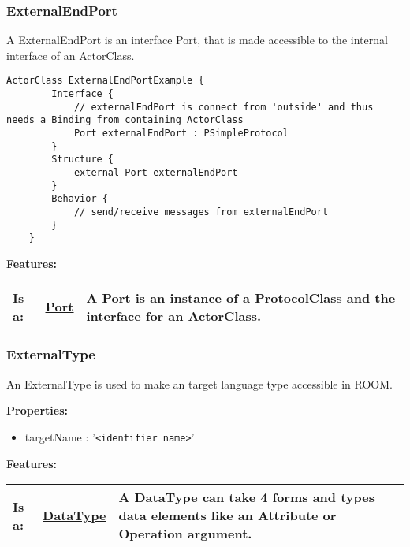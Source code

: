 \subsubsection{ExternalEndPort}
	\hypertarget{ref:ExternalEndPort}{}
	A ExternalEndPort is an interface Port, that is made accessible to the internal interface of an ActorClass.
		
	\begin{lstlisting}[language=ROOM]
	ActorClass ExternalEndPortExample {
		Interface {
			// externalEndPort is connect from 'outside' and thus needs a Binding from containing ActorClass
			Port externalEndPort : PSimpleProtocol
		}
		Structure {
			external Port externalEndPort
		}
		Behavior {
			// send/receive messages from externalEndPort
		}
	}
	\end{lstlisting}
		
		
	\begingroup
	\textbf{Features:}
	\renewcommand{\arraystretch}{1.8} %
	\begin{longtable}{l|l p{}}
		\hline
	Is a: & \tabitem \hyperlink{ref:Port}{Port}  & A Port is an instance of a ProtocolClass and the interface for an ActorClass.\\
	\hline
	\end{longtable}
	\endgroup
		
		
	
	\vspace{\baselineskip}
	\vspace{\baselineskip}
	\vspace{\baselineskip}
	
\subsubsection{ExternalType}
	\hypertarget{ref:ExternalType}{}
	An ExternalType is used to make an target language type accessible in ROOM.
		
		
	\textbf{Properties:}
	\begin{itemize}
	\item targetName : '\verb|<identifier name>|'
	\end{itemize}
		
	\begingroup
	\textbf{Features:}
	\renewcommand{\arraystretch}{1.8} %
	\begin{longtable}{l|l p{}}
		\hline
	Is a: & \tabitem \hyperlink{ref:DataType}{DataType}  & A DataType can take 4 forms and types data elements like an Attribute or Operation argument.\\
	\hline
	\end{longtable}
	\endgroup
		
